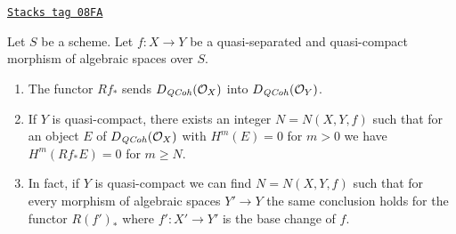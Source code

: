 \begin{lemma}
\label{spaces-perfect-lemma-quasi-coherence-direct-image}
\href{https://stacks.math.columbia.edu/tag/08FA}{\texttt{Stacks tag 08FA}}

Let $S$ be a scheme. Let $f : X \to Y$ be a quasi-separated and quasi-compact
morphism of algebraic spaces over $S$.
\begin{enumerate}
\item The functor $Rf_*$ sends $D_{\mathit{QCoh}}(\mathcal{O}_X)$
into $D_{\mathit{QCoh}}(\mathcal{O}_Y)$.
\item If $Y$ is quasi-compact, there exists an integer $N = N(X, Y, f)$
such that for an object $E$ of $D_{\mathit{QCoh}}(\mathcal{O}_X)$
with $H^m(E) = 0$ for $m > 0$ we have
$H^m(Rf_*E) = 0$ for $m \geq N$.
\item In fact, if $Y$ is quasi-compact we can find $N = N(X, Y, f)$
such that for every morphism of algebraic spaces $Y' \to Y$
the same conclusion holds for the functor $R(f')_*$
where $f' : X' \to Y'$ is the base change of $f$.
\end{enumerate}
\end{lemma}

